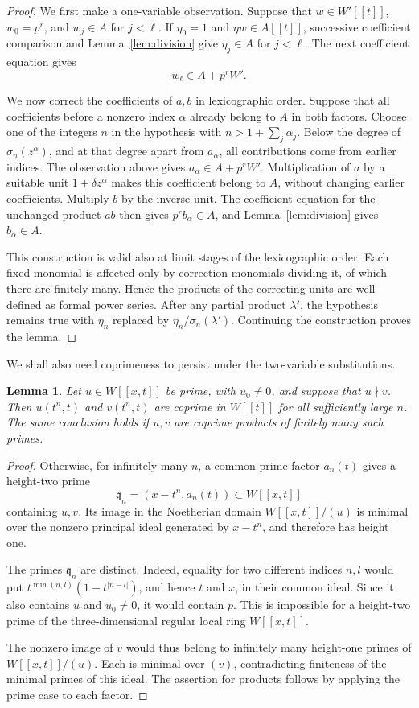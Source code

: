\documentclass[11pt]{amsart}
\newtheorem{lemma}[theorem]{Lemma}
\theoremstyle{remark}
\begin{document}
\begin{proof}
We first make a one-variable observation. Suppose that
$w\in W'[[t]]$, $w_0=p^r$, and $w_j\in A$ for $j<\ell$.
If $\eta_0=1$ and $\eta w\in A[[t]]$, successive coefficient
comparison and Lemma~\ref{lem:division} give $\eta_j\in A$
for $j<\ell$. The next coefficient equation gives
\[
 w_\ell\in A+p^rW'.
\]

We now correct the coefficients of $a,b$ in lexicographic order.
Suppose that all coefficients before a nonzero index $\alpha$
already belong to $A$ in both factors. Choose one of the integers
$n$ in the hypothesis with $n>1+\sum_j\alpha_j$. Below the degree
of $\sigma_n(z^\alpha)$, and at that degree apart from
$a_\alpha$, all contributions come from earlier indices. The
observation above gives $a_\alpha\in A+p^rW'$. Multiplication
of $a$ by a suitable unit $1+\delta z^\alpha$ makes this
coefficient belong to $A$, without changing earlier coefficients.
Multiply $b$ by the inverse unit. The coefficient equation for the
unchanged product $ab$ then gives $p^r b_\alpha\in A$, and
Lemma~\ref{lem:division} gives $b_\alpha\in A$.

This construction is valid also at limit stages of the lexicographic
order. Each fixed monomial is affected only by correction monomials
dividing it, of which there are finitely many. Hence the products of
the correcting units are well defined as formal power series. After
any partial product $\lambda'$, the hypothesis remains true with
$\eta_n$ replaced by $\eta_n/\sigma_n(\lambda')$. Continuing the
construction proves the lemma.
\end{proof}

We shall also need coprimeness to persist under the two-variable
substitutions.

\begin{lemma}\label{lem:coprime}
Let $u\in W[[x,t]]$ be prime, with $u_0\ne0$, and suppose that
$u\nmid v$. Then $u(t^n,t)$ and $v(t^n,t)$ are coprime in
$W[[t]]$ for all sufficiently large $n$. The same conclusion holds
if $u,v$ are coprime products of finitely many such primes.
\end{lemma}

\begin{proof}
Otherwise, for infinitely many $n$, a common prime factor $a_n(t)$
gives a height-two prime
\[
 \mathfrak q_n=(x-t^n,a_n(t))\subset W[[x,t]]
\]
containing $u,v$. Its image in the Noetherian domain
$W[[x,t]]/(u)$ is minimal over the nonzero principal ideal
generated by $x-t^n$, and therefore has height one.

The primes $\mathfrak q_n$ are distinct. Indeed, equality for
two different indices $n,l$ would put
$t^{\min(n,l)}(1-t^{|n-l|})$, and hence $t$ and $x$, in their
common ideal. Since it also contains $u$ and $u_0\ne0$, it would
contain $p$. This is impossible for a height-two prime of the
three-dimensional regular local ring $W[[x,t]]$.

The nonzero image of $v$ would thus belong to infinitely many
height-one primes of $W[[x,t]]/(u)$. Each is minimal over $(v)$,
contradicting finiteness of the minimal primes of this ideal.
The assertion for products follows by applying the prime case to
each factor.
\end{proof}
\end{document}
